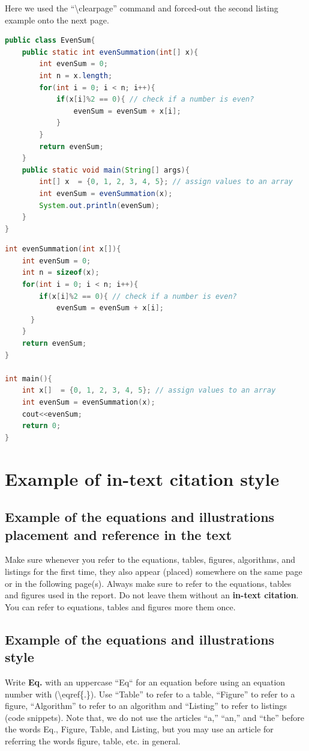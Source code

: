 Here we used  the ``\textbackslash clearpage'' command and forced-out
the second listing example onto the next page.
\clearpage  %
\begin{lstlisting}[language=Java, caption={Code snippet in \LaTeX ~and  this is a Java code example}, label=list:java_code_ex]
public class EvenSum{
    public static int evenSummation(int[] x){
        int evenSum = 0;
        int n = x.length;
        for(int i = 0; i < n; i++){
            if(x[i]%2 == 0){ // check if a number is even?
                evenSum = evenSum + x[i];
            }
        }
        return evenSum;
    }
    public static void main(String[] args){
        int[] x  = {0, 1, 2, 3, 4, 5}; // assign values to an array
        int evenSum = evenSummation(x);
        System.out.println(evenSum);
    }
}
\end{lstlisting}

\begin{lstlisting}[language=C, caption={Code snippet in \LaTeX ~and  this is a C/C++ code example}, label=list:cpp_code_ex]
int evenSummation(int x[]){
    int evenSum = 0;
    int n = sizeof(x);
    for(int i = 0; i < n; i++){
        if(x[i]%2 == 0){ // check if a number is even?
            evenSum = evenSum + x[i];
      }
    }
    return evenSum;
}

int main(){
    int x[]  = {0, 1, 2, 3, 4, 5}; // assign values to an array
    int evenSum = evenSummation(x);
    cout<<evenSum;
    return 0;
}
\end{lstlisting}

\section{Example of in-text citation style}
\subsection{Example of the equations and illustrations placement and
reference in the text}
Make sure whenever you refer to the equations, tables, figures,
algorithms,  and listings for the first time, they also appear
(placed) somewhere on the same page or in the following page(s).
Always make sure to refer to the equations, tables and figures used
in the report. Do not leave them without an \textbf{in-text
citation}. You can refer to equations, tables and figures more them once.

\subsection{Example of the equations and illustrations style}
Write \textbf{Eq.} with an uppercase ``Eq`` for an equation before
using an equation number with (\textbackslash eqref\{.\}). Use
``Table'' to refer to a table, ``Figure'' to refer to a figure,
``Algorithm'' to refer to an algorithm and ``Listing'' to refer to
listings (code snippets). Note that, we do not use the articles
``a,'' ``an,'' and ``the'' before the words Eq., Figure, Table, and
Listing, but you may use an article for referring the words figure,
table, etc. in general.


